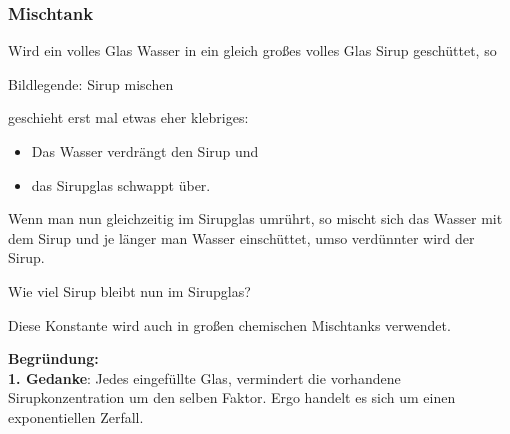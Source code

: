 \subsubsection{Mischtank}\label{sirup_beispiel}
Wird ein volles Glas Wasser in ein gleich großes volles Glas Sirup geschüttet, so

\begin{center}{\footnotesize Bildlegende: Sirup mischen}\end{center}

geschieht erst mal etwas eher klebriges:
\begin{itemize}
  \item Das Wasser verdrängt den Sirup und
  \item das Sirupglas schwappt über.
\end{itemize}

Wenn man nun gleichzeitig im Sirupglas
umrührt, so mischt sich das Wasser mit dem Sirup und je länger man
Wasser einschüttet, umso verdünnter wird der Sirup.


Wie viel Sirup bleibt nun im Sirupglas?


Diese Konstante wird auch in großen chemischen Mischtanks verwendet.
\newpage


\textbf{Begründung:}\\
\textbf{1. Gedanke}: Jedes eingefüllte Glas, vermindert die vorhandene
Sirupkonzentration um den selben Faktor. Ergo handelt es sich um
einen exponentiellen Zerfall.

\leserluft

